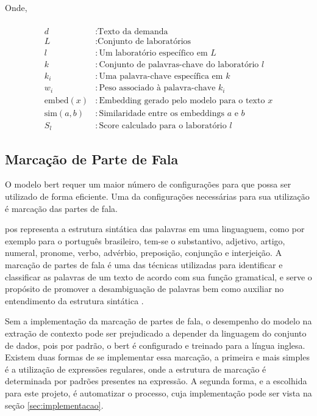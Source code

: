 Onde,

\begin{align*}                                                                                 \\
    d                & : \text{Texto da demanda}                          \\
    L                & : \text{Conjunto de laboratórios}                    \\
    l                & : \text{Um laboratório específico em } L                                  \\
    k                & : \text{Conjunto de palavras-chave do laboratório } l \\
    k_i              & : \text{Uma palavra-chave específica em } k                               \\
    w_i              & : \text{Peso associado à palavra-chave } k_i                              \\
    \text{embed}(x)  & : \text{Embedding gerado pelo modelo para o texto } x                     \\
    \text{sim}(a, b) & : \text{Similaridade entre os embeddings } a \text{ e } b                 \\
    S_l              & : \text{Score calculado para o laboratório } l
\end{align*}

\subsection{Marcação de Parte de Fala}\label{subsec:pos_tagging}

O modelo \gls{bert} requer um maior número de configurações para que possa ser utilizado de forma eficiente. Uma da configurações necessárias para sua utilização é marcação das partes de fala.

\gls{pos} representa a estrutura sintática das palavras em uma linguaguem, como por exemplo para o português brasileiro, tem-se o substantivo, adjetivo, artigo, numeral, pronome, verbo, advérbio, preposição, conjunção e interjeição. A marcação de partes de fala é uma das técnicas utilizadas para identificar e classificar as palavras de um texto de acordo com sua função gramatical, e serve o propósito de promover a desambiguação de palavras bem como auxiliar no entendimento da estrutura sintática \cite{JurafskyMartin2024}.

Sem a implementação da marcação de partes de fala, o desempenho do modelo na extração de contexto pode ser prejudicado a depender da linguagem do conjunto de dados, pois por padrão, o \gls{bert} é configurado e treinado para a língua inglesa. Existem duas formas de se implementar essa marcação, a primeira e mais simples é a utilização de expressões regulares, onde a estrutura de marcação é determinada por padrões presentes na expressão. A segunda forma, e a escolhida para este projeto, é automatizar o processo, cuja implementação pode ser vista na seção \ref{sec:implementacao}.